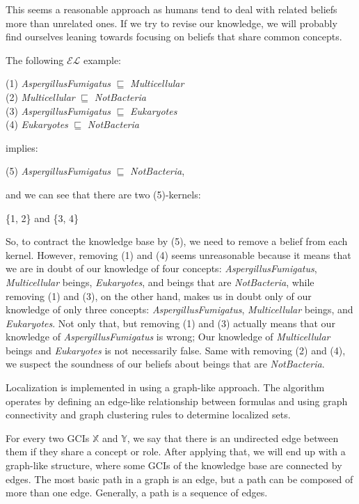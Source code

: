 This seems a reasonable approach as humans tend to deal with related beliefs more than unrelated ones. If we try to revise our knowledge, we will probably find ourselves leaning towards focusing on beliefs that share common concepts. 

The following $\mathcal{EL}$ example:
\begin{center}
(1) \textit{AspergillusFumigatus} $\sqsubseteq$ \textit{Multicellular} \\
(2) \textit{Multicellular} $\sqsubseteq$ \textit{NotBacteria} \\
(3) \textit{AspergillusFumigatus} $\sqsubseteq$ \textit{Eukaryotes} \\
(4) \textit{Eukaryotes} $\sqsubseteq$ \textit{NotBacteria} 
\end{center}
implies:
\begin{center}
(5) \textit{AspergillusFumigatus} $\sqsubseteq$ \textit{NotBacteria},
\end{center}
and we can see that there are two (5)-kernels:
\begin{center}
\{1, 2\} and \{3, 4\}
\end{center}

So, to contract the knowledge base by (5), we need to remove a belief from each kernel. However, removing (1) and (4) seems unreasonable because it means that we are in doubt of our knowledge of four concepts: \textit{AspergillusFumigatus}, \textit{Multicellular} beings, \textit{Eukaryotes}, and beings that are \textit{NotBacteria}, while removing (1) and (3), on the other hand, makes us in doubt only of our knowledge of only three concepts: \textit{AspergillusFumigatus}, \textit{Multicellular} beings, and \textit{Eukaryotes}. Not only that, but removing (1) and (3) actually means that our knowledge of \textit{AspergillusFumigatus} is wrong; Our knowledge of \textit{Multicellular} beings and \textit{Eukaryotes} is not necessarily false. Same with removing (2) and (4), we suspect the soundness of our beliefs about beings that are \textit{NotBacteria}.

Localization is implemented in \cite{zwei} using a graph-like approach. The algorithm operates by defining an edge-like relationship between formulas and using graph connectivity and graph clustering rules to determine localized sets. 

For every two GCIs $\mathbb{X}$ and $\mathbb{Y}$, we say that there is an undirected edge between them if they share a concept or role.
After applying that, we will end up with a graph-like structure, where some GCIs of the knowledge base are connected by edges. The most basic path in a graph is an edge, but a path can be composed of more than one edge. Generally, a path is a sequence of edges.

